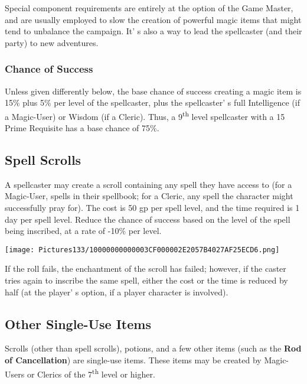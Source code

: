 \documentclass[a4paper,twoside,openany,10pt]{book}
\begin{document}
\begin{multicols}{2}
Special component requirements are entirely at the option of the Game Master, and are usually employed to slow the creation of powerful magic items that might tend to unbalance the campaign. It' s also a way to lead the spellcaster (and their party) to new adventures.

\subsubsection{Chance of Success}\label{chance-of-success}

Unless given differently below, the base chance of success creating a magic item is 15\% plus 5\% per level of the spellcaster, plus the spellcaster' s full Intelligence (if a Magic-User) or Wisdom (if a Cleric). Thus, a 9\textsuperscript{th} level spellcaster with a 15 Prime Requisite has a base chance of 75\%.

\subsection{Spell Scrolls}\label{spell-scrolls}

A spellcaster may create a scroll containing any spell they have access to (for a Magic-User, spells in their spellbook; for a Cleric, any spell the character might successfully pray for). The cost is 50 gp per spell level, and the time required is 1 day per spell level. Reduce the chance of success based on the level of the spell being inscribed, at a rate of -10\% per level.

\begin{center}
	\texttt{[image: Pictures133/10000000000003CF000002E2057B4027AF25ECD6.png]}
\end{center}

If the roll fails, the enchantment of the scroll has failed; however, if the caster tries again to inscribe the same spell, either the cost or the time is reduced by half (at the player' s option, if a player character is involved).

\subsection{Other Single-Use Items}\label{other-single-use-items}

Scrolls (other than spell scrolls), potions, and a few other items (such as the \textbf{Rod of Cancellation}) are single-use items. These items may be created by Magic-Users or Clerics of the 7\textsuperscript{th} level or higher.


\end{multicols}
\end{document}
